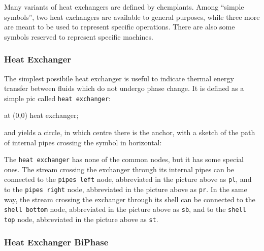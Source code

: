 \documentclass[12pt]{article}						%
\newcommand*{\chpn}[1]{\texttt{#1}}				%
\newcommand*{\chpp}[1]{\texttt{#1}}				%
\newcommand*{\chemplants}{chemplants}
\begin{document}
Many variants of heat exchangers are defined by \chemplants. Among ``simple
symbols'', two heat exchangers are available to general purposes, while three
more are meant to be used to represent specific operations. There are also some
symbols reserved to represent specific machines.

\subsubsection{Heat Exchanger}

The simplest possibile heat exchanger is useful to indicate thermal energy
transfer between fluids which do not undergo phase change. It is defined as a
simple pic called \chpp{heat exchanger}:
\begin{chpcode}
	\pic at (0,0) {heat exchanger};
\end{chpcode}
and yields a circle, in which centre there is the anchor, with a sketch of the
path of internal pipes crossing the symbol in horizontal:
\begin{center}
\end{center}

The \chpp{heat exchanger} has none of the common nodes, but it has some special
ones. The stream crossing the exchanger through its internal pipes can be
connected to the \chpn{pipes left} node, abbreviated in the picture above as
\chpn{pl}, and to the \chpn{pipes right} node, abbreviated in the picture above
as \chpn{pr}. In the same way, the stream crossing the exchanger through its
shell can be connected to the \chpn{shell bottom} node, abbreviated in the
picture above as \chpn{sb}, and to the \chpn{shell top} node, abbreviated in
the picture above as \chpn{st}.

\subsubsection{Heat Exchanger BiPhase}
\end{document}
